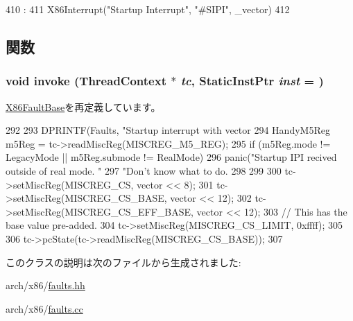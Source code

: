 \begin{DoxyCode}
410                                           :
411             X86Interrupt("Startup Interrupt", "#SIPI", _vector)
412         {}

\end{DoxyCode}


\subsection{関数}
\hypertarget{classX86ISA_1_1StartupInterrupt_a2bd783b42262278d41157d428e1f8d6f}{
\subsubsection[{invoke}]{\setlength{\rightskip}{0pt plus 5cm}void invoke ({\bf ThreadContext} $\ast$ {\em tc}, \/  {\bf StaticInstPtr} {\em inst} = {})}}
\label{classX86ISA_1_1StartupInterrupt_a2bd783b42262278d41157d428e1f8d6f}


\hyperlink{classX86ISA_1_1X86FaultBase_a2bd783b42262278d41157d428e1f8d6f}{X86FaultBase}を再定義しています。


\begin{DoxyCode}
292     {
293         DPRINTF(Faults, "Startup interrupt with vector %
294         HandyM5Reg m5Reg = tc->readMiscReg(MISCREG_M5_REG);
295         if (m5Reg.mode != LegacyMode || m5Reg.submode != RealMode) {
296             panic("Startup IPI recived outside of real mode. "
297                     "Don't know what to do. %
298         }
299 
300         tc->setMiscReg(MISCREG_CS, vector << 8);
301         tc->setMiscReg(MISCREG_CS_BASE, vector << 12);
302         tc->setMiscReg(MISCREG_CS_EFF_BASE, vector << 12);
303         // This has the base value pre-added.
304         tc->setMiscReg(MISCREG_CS_LIMIT, 0xffff);
305 
306         tc->pcState(tc->readMiscReg(MISCREG_CS_BASE));
307     }
\end{DoxyCode}


このクラスの説明は次のファイルから生成されました:\begin{DoxyCompactItemize}
\item 
arch/x86/\hyperlink{arch_2x86_2faults_8hh}{faults.hh}\item 
arch/x86/\hyperlink{arch_2x86_2faults_8cc}{faults.cc}\end{DoxyCompactItemize}
